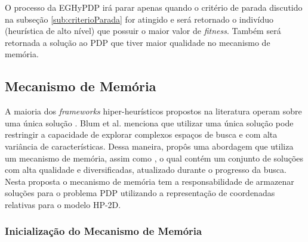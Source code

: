 

O processo da EGHyPDP irá parar apenas quando o critério de parada discutido na subseção \ref{sub:criterioParada} for atingido e será retornado o indivíduo (heurística de alto nível) que possuir o maior valor de \textit{fitness}. Também será retornada a solução ao PDP que tiver maior qualidade no mecanismo de memória.



\subsection{Mecanismo de Memória}
\label{sub:MecanismoDeMemoria}

A maioria dos \textit{frameworks} hiper-heurísticos propostos na literatura operam sobre uma única solução \cite{chakhlevitch2008hyperheuristics, burke2013hyper}. Blum et al. \cite{blum2011hybrid} menciona que utilizar uma única solução pode restringir a capacidade de explorar complexos espaços de busca e com alta variância de características. Dessa maneira,  \cite{sabar2015automatic} propôs uma abordagem que utiliza um mecanismo de memória, assim como  \cite{talbi2006cosearch}, o qual contém um conjunto de soluções com alta qualidade e diversificadas, atualizado durante o progresso da busca. Nesta proposta o mecanismo de memória tem a responsabilidade de armazenar soluções para o problema PDP utilizando a representação de coordenadas relativas para o modelo HP-2D. 

\subsubsection{Inicialização do Mecanismo de Memória}

